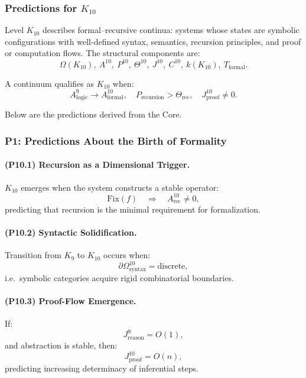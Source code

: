 

\subsubsection{Predictions for $K_{10}$}
\label{sec:predictions-k10}

Level $K_{10}$ describes formal–recursive continua:
systems whose states are symbolic configurations with
well-defined syntax, semantics, recursion principles,
and proof or computation flows.
The structural components are:
\[
\Omega(K_{10}),\
A^{10},\
P^{10},\
\Theta^{10},\
J^{10},\
C^{10},\
k(K_{10}),\
T_{\mathrm{formal}}.
\]

A continuum qualifies as $K_{10}$ when:
\[
A_{\mathrm{logic}}^{9} \to A_{\mathrm{formal}}^{10}, \quad
P_{\mathrm{recursion}} > \Theta_{\mathrm{rec}}, \quad
J_{\mathrm{proof}}^{10} \neq 0.
\]

Below are the predictions derived from the Core.

\subsubsection{P1: Predictions About the Birth of Formality}

\paragraph{(P10.1) Recursion as a Dimensional Trigger.}
$K_{10}$ emerges when the system constructs a stable operator:
\[
\mathrm{Fix}(f) \quad \Rightarrow \quad A_{\mathrm{rec}}^{10} \neq 0,
\]
predicting that recursion is the minimal requirement for formalization.

\paragraph{(P10.2) Syntactic Solidification.}
Transition from $K_9$ to $K_{10}$ occurs when:
\[
\partial\Omega_{\mathrm{syntax}}^{10} = \text{discrete},
\]
i.e.\ symbolic categories acquire rigid combinatorial boundaries.

\paragraph{(P10.3) Proof-Flow Emergence.}
If:
\[
J_{\mathrm{reason}}^{9} = O(1),
\]
and abstraction is stable, then:
\[
J_{\mathrm{proof}}^{10} = O(n),
\]
predicting increasing determinacy of inferential steps.

